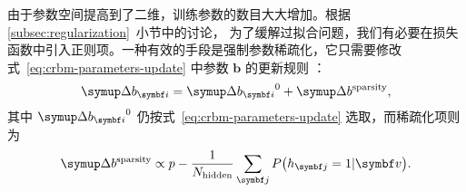 由于参数空间提高到了二维，训练参数的数目大大增加。根据 \ref{subsec:regularization}~小节中的讨论，
为了缓解过拟合问题，我们有必要在损失函数中引入正则项。一种有效的手段是强制参数稀疏化，它只需要修改
式~\eqref{eq:crbm-parameters-update} 中参数 $\bm{b}$ 的更新规则
\cite{lee2009convolutional,lee2011unsupervised}：
\begin{equation}
  \incr{b_{\bm{i}}} = \incr{b_{\bm{i}}}^0 + \incr{b}^{\text{sparsity}},
\end{equation}
其中 $\incr{b_{\bm{i}}}^0$ 仍按式~\eqref{eq:crbm-parameters-update} 选取，而稀疏化项则为
\begin{equation}
  \incr{b}^{\text{sparsity}}
  \propto p - \frac{1}{N_{\text{hidden}}} \sum_{\bm{j}} P\qty\big(h_{\bm{j}}=1|\bm{v}).
\end{equation}
